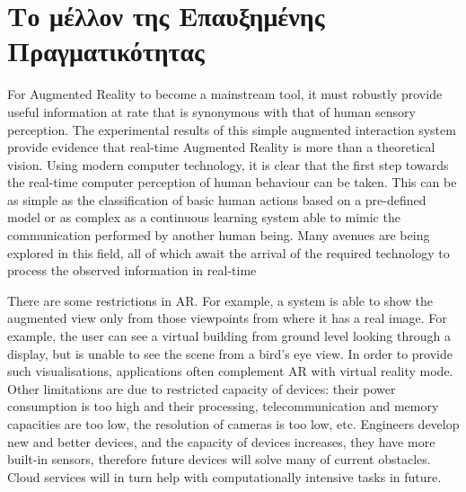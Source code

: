 \section{Το μέλλον της Επαυξημένης Πραγματικότητας}

For Augmented Reality to become a mainstream tool, it must robustly provide useful information at rate that is synonymous with that of human sensory perception. The experimental results of this simple augmented interaction system provide evidence that real-time Augmented Reality is more than a theoretical vision. Using modern computer technology, it is clear that the first step towards the real-time computer perception of human behaviour can be taken. This can be as simple as the classification of basic human actions based on a pre-defined model or as complex as a continuous learning system able to mimic the communication performed by another human being. Many avenues are being explored in this field, all of which await the arrival of the required technology to process the observed information in real-time







There are some restrictions in AR. For example, a system is able to show the augmented view only from those viewpoints from where it has a real image. For example, the user can see a virtual building from ground level looking through a display, but is unable to see the scene from a bird's eye view. In order to provide such visualisations, applications often complement AR with virtual reality mode. Other limitations are due to restricted capacity of devices: their power consumption is too high and their processing, telecommunication and memory capacities are too low, the resolution of cameras is too low, etc. Engineers develop new and better devices, and the capacity of devices increases, they have more built-in sensors, therefore future devices will solve many of current obstacles. Cloud services will in turn help with computationally intensive tasks in future.

